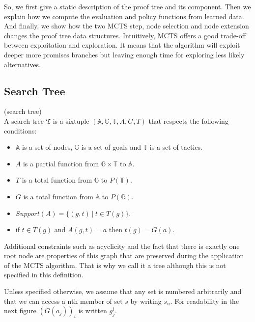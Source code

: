 \documentclass[runningheads,a4paper,draft]{svjour3}
\begin{document}
So, we first give a static description of the proof tree and its component.
Then we explain how we compute the evaluation and policy functions from learned 
data. And finally, we show how the two MCTS step, node selection and node 
extension changes the proof tree data structures.
Intuitively, MCTS offers a good trade-off between exploitation and exploration. 
It means that the algorithm will exploit deeper more promises branches but 
leaving enough time for exploring less likely alternatives.

\subsection{Search Tree}

\begin{definition}(search tree)\\
A search tree $\mathfrak{T}$ is a sixtuple 
$(\mathbb{A},\mathbb{G},\mathbb{T},A,G,T)$ 
that respects the following conditions:
\begin{itemize}
\item $\mathbb{A}$ is a set of nodes, $\mathbb{G}$ is a set of goals 
 and $\mathbb{T}$ is a set of tactics.
\item $A$ is a partial function from $\mathbb{G} \times \mathbb{T}$ to 
$\mathbb{A}$.
\item $T$ is a total function from $\mathbb{G}$ to $P(\mathbb{T})$.
\item $G$ is a total function from $\mathbb{A}$ to $P(\mathbb{G})$.
\item $Support(A) = \lbrace (g,t)\ |\ t \in T(g) \rbrace$.
\item if $t \in T(g)$ and $A(g,t) = a$ then $t(g) = G(a)$.
\end{itemize}

Additional constraints such as acyclicity and the fact that there is exactly 
one root node are properties of this graph that are preserved during the 
application of the MCTS algorithm. That is why we call it a tree although this 
is not specified in this definition.
\end{definition}

Unless specified otherwise, we assume that any set is numbered arbitrarily and 
that we can access a nth member of set 
$s$ by writing $s_n$. For readability in the next figure $(G(a_j))_i$ is 
written $g_j^i$.
\end{document}

